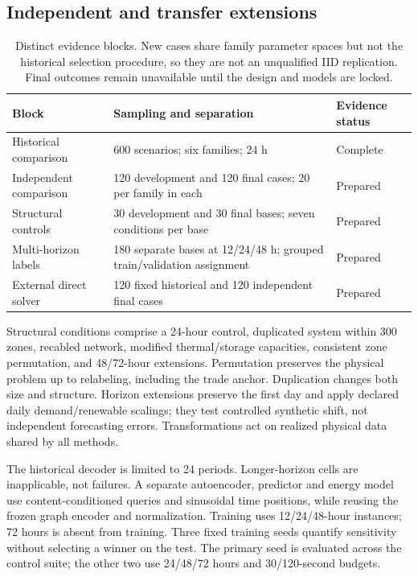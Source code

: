 \subsection{Independent and transfer extensions}
\label{sec:extensions}
\begin{table}[htbp]\centering\small
\begin{tabular}{p{.24\linewidth}p{.40\linewidth}p{.24\linewidth}}\toprule
Block & Sampling and separation & Evidence status\\\midrule
Historical comparison & 600 scenarios; six families; 24 h & Complete\\
Independent comparison & 120 development and 120 final cases; 20 per family in each & Prepared\\
Structural controls & 30 development and 30 final bases; seven conditions per base & Prepared\\
Multi-horizon labels & 180 separate bases at 12/24/48 h; grouped train/validation assignment & Prepared\\
External direct solver & 120 fixed historical and 120 independent final cases & Prepared\\\bottomrule
\end{tabular}
\caption{Distinct evidence blocks. New cases share family parameter spaces but not the historical selection procedure, so they are not an unqualified IID replication. Final outcomes remain unavailable until the design and models are locked.}\label{tab:cohorts}
\end{table}

Structural conditions comprise a 24-hour control, duplicated system within
300 zones, recabled network, modified thermal/storage capacities, consistent
zone permutation, and 48/72-hour extensions. Permutation preserves the physical
problem up to relabeling, including the trade anchor. Duplication changes both
size and structure. Horizon extensions preserve the first day and apply
declared daily demand/renewable scalings; they test controlled synthetic shift,
not independent forecasting errors. Transformations act on realized physical
data shared by all methods.

The historical decoder is limited to 24 periods. Longer-horizon cells are
inapplicable, not failures. A separate autoencoder, predictor and energy model
use content-conditioned queries and sinusoidal time positions, while reusing
the frozen graph encoder and normalization. Training uses 12/24/48-hour
instances; 72 hours is absent from training. Three fixed training seeds
quantify sensitivity without selecting a winner on the test. The primary seed
is evaluated across the control suite; the other two use 24/48/72 hours and
30/120-second budgets.

